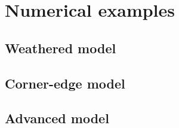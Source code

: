\documentclass{gnulike}
\begin{document}
\chapter{Numerical examples}

\section{Weathered model}

\section{Corner-edge model}

\section{Advanced model}


\begin{appendices}




\end{appendices}
  



\clearpage
\newpage
\thispagestyle{empty}
\printindex
\end{document}
